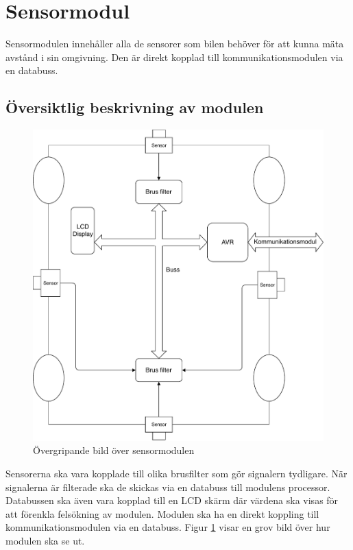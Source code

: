 \documentclass[systemskiss/skiss.tex]{subfiles}
\begin{document}
\section{Sensormodul}
Sensormodulen innehåller alla de sensorer som bilen behöver för att kunna mäta avstånd i sin omgivning. Den är direkt kopplad till kommunikationsmodulen via en databuss.
\subsection{Översiktlig beskrivning av modulen}
\begin{figure}[h]
    \centering
    \includegraphics[width=0.6\linewidth]{systemskiss/figures/sensormodul.pdf}
    \caption{Övergripande bild över sensormodulen}
    \label{fig:sensorskiss}
\end{figure}
\noindent
Sensorerna ska vara kopplade till olika brusfilter som gör signalern tydligare. När signalerna är filterade ska de skickas via en databuss till modulens processor. Databussen ska även vara kopplad till en LCD skärm där värdena ska visas för att förenkla felsökning av modulen. Modulen ska ha en direkt koppling till kommunikationsmodulen via en databuss. Figur \ref{fig:sensorskiss} visar en grov bild över hur modulen ska se ut.
\end{document}

